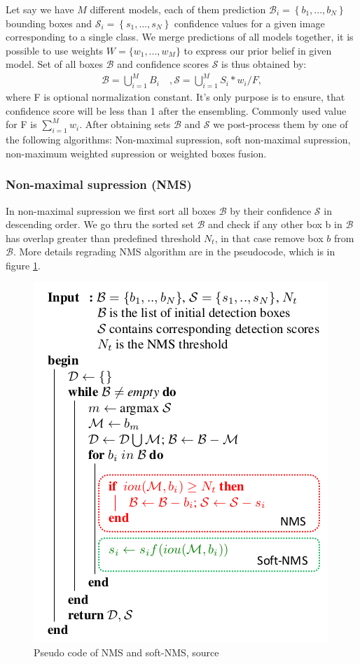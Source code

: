 Let say we have $M$ different models, each of them prediction $\mathcal{B}_i = \left\{b_1,...,b_N \right\} $ bounding boxes and $\mathcal{S}_i = \left\{ s_1,...,s_N \right\} $ confidence values for a given image corresponding to a single class. We merge predictions of all models together, it is possible to use weights $\mathit{W} = \{w_1,...,w_M \}$ to express our prior belief in given model. Set of all boxes $\mathcal{B}$ and confidence scores $\mathcal{S}$ is thus obtained by:
\begin{align}
    \mathcal{B} = \bigcup_{i=1}^{M} B_i \quad, \mathcal{S} = \bigcup_{i=1}^{M} S_i * w_i / F,
\end{align}
where F is optional normalization constant. It's only purpose is to ensure, that confidence score will be less than 1 after the ensembling. Commonly used value for F is $\sum_{i=1}^M w_i$. After obtaining sets $\mathcal{B}$ and $\mathcal{S}$ we post-process them by one of the following algorithms: Non-maximal supression, soft non-maximal supression, non-maximum weighted supression or weighted boxes fusion.

\subsubsection{Non-maximal supression (NMS)}
In non-maximal supression we first sort all boxes $\mathcal{B}$ by their confidence $\mathcal{S}$ in descending order. We go thru the sorted set $\mathcal{B}$ and check if any other box b in $\mathcal{B}$ has overlap greater than predefined threshold $N_t$, in that case remove box $b$ from $\mathcal{B}$. More details regrading NMS algorithm are in the pseudocode, which is in figure \ref{alg:nms}.
\begin{figure}
    \centering
    \includegraphics{images/nms_algo.png}
    \caption{Pseudo code of NMS and soft-NMS, source \cite{Bodla2017}}
    \label{alg:nms}
\end{figure}

